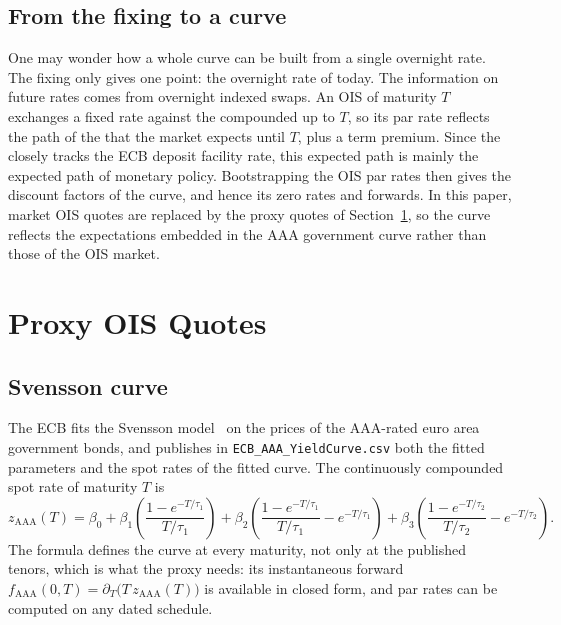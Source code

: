 \documentclass[11pt,a4paper]{article}
\theoremstyle{plain}
\theoremstyle{definition}
\newcommand{\estr}{\text{\texteuro STR}}
\begin{document}
\subsection{From the \estr{} fixing to a curve}

One may wonder how a whole curve can be built from a single overnight rate.
The \estr{} fixing only gives one point: the overnight rate of today. The
information on future rates comes from overnight indexed swaps. An OIS of
maturity $T$ exchanges a fixed rate against the \estr{} compounded up to $T$,
so its par rate reflects the path of the \estr{} that the market expects until
$T$, plus a term premium. Since the \estr{} closely tracks the ECB deposit
facility rate, this expected path is mainly the expected path of monetary
policy. Bootstrapping the OIS par rates then gives the discount factors of the
\estr{} curve, and hence its zero rates and forwards. In this paper, market OIS
quotes are replaced by the proxy quotes of Section~\ref{sec:proxy}, so the
curve reflects the expectations embedded in the AAA government curve rather
than those of the OIS market.

\clearpage
\section{Proxy OIS Quotes}
\label{sec:proxy}

\subsection{Svensson curve}

The ECB fits the Svensson model~\cite{svensson} on the prices of the AAA-rated euro area government bonds, and publishes in \texttt{ECB\_AAA\_YieldCurve.csv} both the fitted parameters and the spot rates of the fitted curve. The continuously compounded spot rate of maturity $T$ is
\begin{equation}
z_{\mathrm{AAA}}(T) = \beta_0 + \beta_1 \left( \frac{1 - e^{-T/\tau_1}}{T/\tau_1} \right) + \beta_2 \left( \frac{1 - e^{-T/\tau_1}}{T/\tau_1} - e^{-T/\tau_1} \right) + \beta_3 \left( \frac{1 - e^{-T/\tau_2}}{T/\tau_2} - e^{-T/\tau_2} \right).
\label{eq:svensson}
\end{equation}
The formula defines the curve at every maturity, not only at the published tenors, which is what the proxy needs: its instantaneous forward $f_{\mathrm{AAA}}(0,T)=\partial_T\bigl(T\,z_{\mathrm{AAA}}(T)\bigr)$ is available in closed form, and par rates can be computed on any dated schedule.
\end{document}
